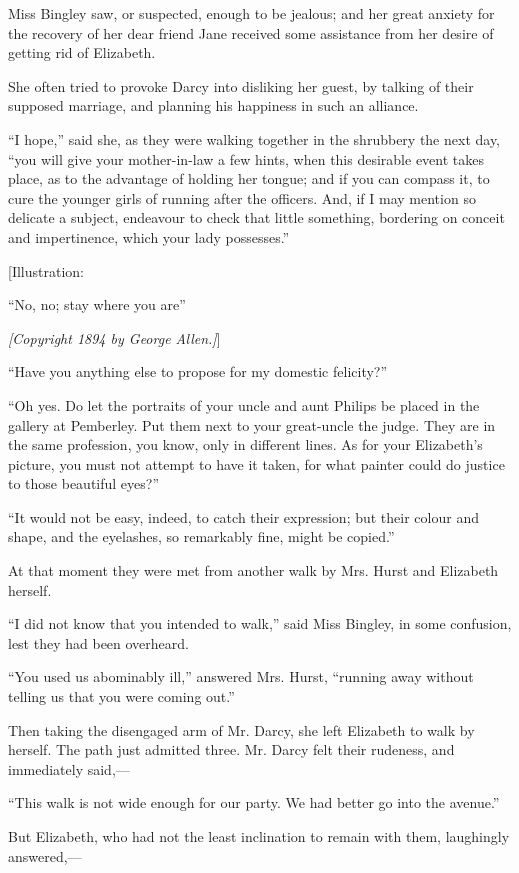 \documentclass[12pt]{book}
\begin{document}
Miss Bingley saw, or suspected, enough to be jealous; and her great anxiety for the recovery of her dear friend Jane received some assistance from her desire of getting rid of Elizabeth.

She often tried to provoke Darcy into disliking her guest, by talking of their supposed marriage, and planning his happiness in such an alliance.

``I hope,'' said she, as they were walking together in the shrubbery the next day, ``you will give your mother-in-law a few hints, when this desirable event takes place, as to the advantage of holding her tongue; and if you can compass it, to cure the younger girls of running after the officers. And, if I may mention so delicate a subject, endeavour to check that little something, bordering on conceit and impertinence, which your lady possesses.''

[Illustration:

``No, no; stay where you are''

\emph{[\textit{Copyright 1894 by George Allen.}]}]

``Have you anything else to propose for my domestic felicity?''

``Oh yes. Do let the portraits of your uncle and aunt Philips be placed in the gallery at Pemberley. Put them next to your great-uncle the judge. They are in the same profession, you know, only in different lines. As for your Elizabeth's picture, you must not attempt to have it taken, for what painter could do justice to those beautiful eyes?''

``It would not be easy, indeed, to catch their expression; but their colour and shape, and the eyelashes, so remarkably fine, might be copied.''

At that moment they were met from another walk by Mrs. Hurst and Elizabeth herself.

``I did not know that you intended to walk,'' said Miss Bingley, in some confusion, lest they had been overheard.

``You used us abominably ill,'' answered Mrs. Hurst, ``running away without telling us that you were coming out.''

Then taking the disengaged arm of Mr. Darcy, she left Elizabeth to walk by herself. The path just admitted three. Mr. Darcy felt their rudeness, and immediately said,---

``This walk is not wide enough for our party. We had better go into the avenue.''

But Elizabeth, who had not the least inclination to remain with them, laughingly answered,---
\end{document}
